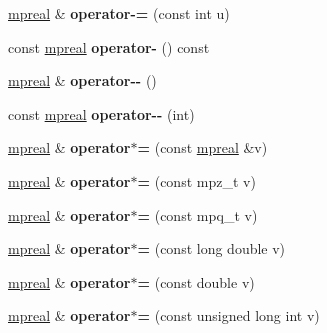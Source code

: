 \begin{DoxyCompactItemize}
\hyperlink{classmpfr_1_1mpreal}{mpreal} \& {\bfseries operator-\/=} (const int u)
\item 
\mbox{\label{classmpfr_1_1mpreal_a27b354824f9819f6e5b08ed3b3bc1d1e}} 
const \hyperlink{classmpfr_1_1mpreal}{mpreal} {\bfseries operator-\/} () const
\item 
\mbox{\label{classmpfr_1_1mpreal_a1ea4395fca6a693a1fa07cbde7cfc204}} 
\hyperlink{classmpfr_1_1mpreal}{mpreal} \& {\bfseries operator-\/-\/} ()
\item 
\mbox{\label{classmpfr_1_1mpreal_aa1475ade1373d162edeac76dcaacd50e}} 
const \hyperlink{classmpfr_1_1mpreal}{mpreal} {\bfseries operator-\/-\/} (int)
\item 
\mbox{\label{classmpfr_1_1mpreal_a71aaa7b58ecb25510c2a2e5a76e0fea1}} 
\hyperlink{classmpfr_1_1mpreal}{mpreal} \& {\bfseries operator$\ast$=} (const \hyperlink{classmpfr_1_1mpreal}{mpreal} \&v)
\item 
\mbox{\label{classmpfr_1_1mpreal_a3c6623691c46629fb6e2cd990cf79007}} 
\hyperlink{classmpfr_1_1mpreal}{mpreal} \& {\bfseries operator$\ast$=} (const mpz\+\_\+t v)
\item 
\mbox{\label{classmpfr_1_1mpreal_ab0e07794f2792a2545c665b7eb734bfd}} 
\hyperlink{classmpfr_1_1mpreal}{mpreal} \& {\bfseries operator$\ast$=} (const mpq\+\_\+t v)
\item 
\mbox{\label{classmpfr_1_1mpreal_a6d80ce9e4cd026baa18cf2fba7bf1274}} 
\hyperlink{classmpfr_1_1mpreal}{mpreal} \& {\bfseries operator$\ast$=} (const long double v)
\item 
\mbox{\label{classmpfr_1_1mpreal_aef06e87effafc124579afa0184c216d4}} 
\hyperlink{classmpfr_1_1mpreal}{mpreal} \& {\bfseries operator$\ast$=} (const double v)
\item 
\mbox{\label{classmpfr_1_1mpreal_add2fad8bd2dcc3c98be5907ec7d1db4c}} 
\hyperlink{classmpfr_1_1mpreal}{mpreal} \& {\bfseries operator$\ast$=} (const unsigned long int v)
\item 

\end{DoxyCompactItemize}
